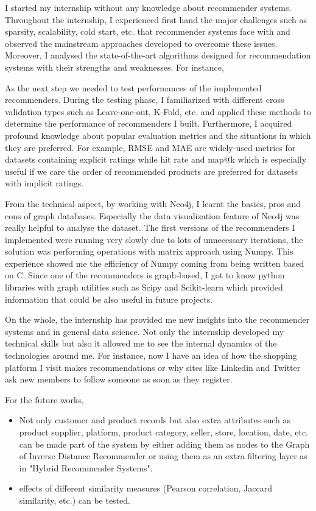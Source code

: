 I started my internship without any knowledge about recommender systems. Throughout the internship, I experienced first hand the major challenges such as sparsity, scalability, cold start, etc. that recommender systems face with and observed the mainstream approaches developed to overcome these issues. Moreover, I analysed the state-of-the-art algorithms designed for recommendation systems with their strengths and weaknesses. For instance, 

As the next step we needed to test performances of the implemented recommenders. During the testing phase, I familiarized with different cross validation types such as Leave-one-out, K-Fold, etc. and applied these methods to determine the performance of recommenders I built. Furthermore, I acquired profound knowledge about popular evaluation metrics and the situations in which they are preferred. For example, RMSE and MAE are widely-used metrics for datasets containing explicit ratings while hit rate and map@k which is especially useful if we care the order of recommended products are preferred for datasets with implicit ratings. 

From the technical aspect, by working with Neo4j, I learnt the basics, pros and cons of graph databases. Especially the data visualization feature of Neo4j was really helpful to analyse the dataset. The first versions of the recommenders I implemented were running very slowly due to lots of unnecessary iterations, the solution was performing operations with matrix approach using Numpy. This experience showed me the efficiency of Numpy coming from being written based on C. Since one of the recommenders is graph-based, I got to know python libraries with graph utilities such as Scipy and Scikit-learn which provided information that could be also useful in future projects.

On the whole, the internship has provided me new insights into the recommender systems and in general data science. Not only the internship developed my technical skills but also it allowed me to see the internal dynamics of the technologies around me.  For instance, now I have an idea of how the shopping platform I visit makes recommendations or why sites like Linkedin and Twitter ask new members to follow someone as soon as they register.

For the future works,
\begin{itemize}
	\item Not only customer and product records but also extra attributes such as product supplier, platform, product category, seller, store, location, date, etc. can be made part of the system by either adding them as nodes to the Graph of Inverse Distance Recommender or using them as an extra filtering layer as in "Hybrid Recommender Systems".
	\item effects of different similarity measures (Pearson correlation, Jaccard similarity, etc.) can be tested.
\end{itemize}
